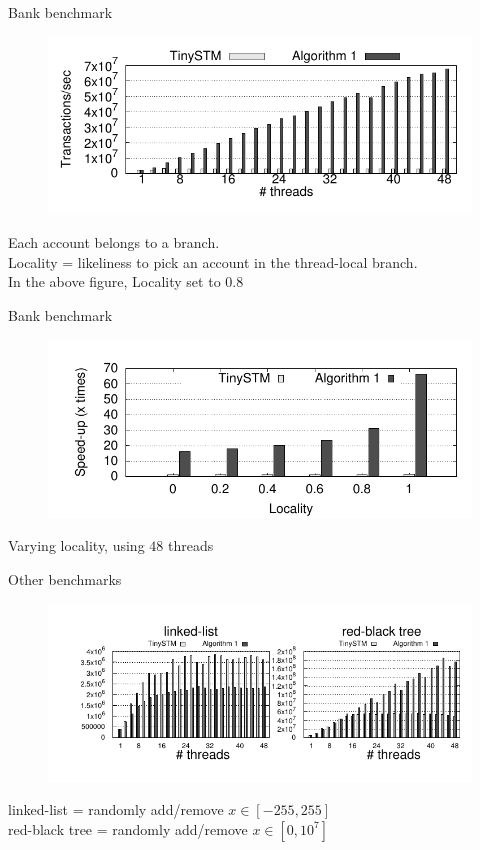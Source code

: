 \begin{frame}{Bank benchmark}
  \begin{figure}
    \includegraphics[scale = 0.8]{results/intset/bank.pdf}
  \end{figure}
  Each account belongs to a branch.\\
  Locality = likeliness to pick an account in the thread-local branch.\\
  \smallskip
  In the above figure, Locality set to $0.8$ \\
\end{frame}
  
\begin{frame}{Bank benchmark}
  \begin{figure}
    \includegraphics[scale = 0.8]{results/bank-speedup/bank-speedup.pdf}
  \end{figure}
  Varying locality, using $48$ threads
\end{frame}

\begin{frame}{Other benchmarks}
  \begin{figure}
    \includegraphics[scale = 0.9]{results/intset/ll-rb.pdf}
  \end{figure}
  linked-list = randomly add/remove $x \in [-255,255]$ \\
  red-black tree = randomly add/remove $x \in [0,10^7]$ 
\end{frame}
